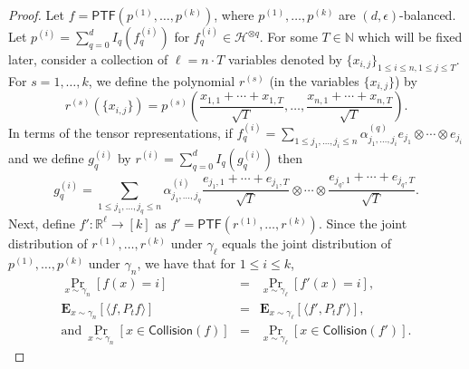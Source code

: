 \documentclass[11pt]{article}
\numberwithin{equation}{section}
\theoremstyle{definition}
\theoremstyle{plain}
\begin{document}
\begin{proof}
    Let $f = \mathsf{PTF}(p^{(1)}, \ldots, p^{(k)})$, where $p^{(1)}, \dots, p^{(k)}$ are $(d, \epsilon)$-balanced.
    Let $p^{(i)} = \sum_{q=0}^d I_q (f_q^{(i)})$ for $f_q^{(i)} \in \mathcal{H}^{\otimes q}$.
    For some $T \in \mathbb{N}$ which will be fixed later, consider a
    collection of $\ell = n \cdot T$ variables denoted by  $\{x_{i,j}\}_{1 \le
    i \le n, 1 \le j \le T}$.
    For $s = 1, \dots, k$, we define the polynomial $r^{(s)}$ (in the variables $\{x_{i,j}\}$) by
    \[
        r^{(s)}(\{x_{i,j}\}) = p^{(s)} \left(
            \frac{x_{1,1} + \cdots + x_{1,T}}{\sqrt T}, \dots, \frac{x_{n,1} + \cdots + x_{n,T}}{\sqrt T}
        \right).
    \]
    In terms of the tensor representations, if
    $f_q^{(i)} = \sum_{1 \le j_1, \ldots, j_i \le n} \alpha^{(q)}_{j_1, \ldots, j_i} e_{j_1} \otimes \cdots \otimes e_{j_i}$
    and we define $g^{(i)}_q$ by $r^{(i)} = \sum_{q=0}^d I_q(g^{(i)}_q)$ then
$$
g_{q}^{(i)}= \sum_{1 \le j_1, \ldots, j_q \le n} \alpha^{(i)}_{j_1, \ldots, j_q} \frac{e_{j_1,1} + \cdots + e_{j_1,T}}{\sqrt{T}} \otimes \cdots \otimes \frac{e_{j_q,1} + \cdots + e_{j_q,T}}{\sqrt{T}}. 
$$
Next, define $f' : \mathbb{R}^{\ell} \rightarrow [k]$ as $f'= \mathsf{PTF}(r^{(1)}, \ldots, r^{(k)})$. Since the joint distribution
of $r^{(1)}, \dots, r^{(k)}$ under $\gamma_\ell$ equals the joint distribution of $p^{(1)}, \dots, p^{(k)}$ under $\gamma_n$,
we have that for $1\le i \le k$,
\begin{eqnarray}
\Pr_{x \sim \gamma_n}[f(x)=i] &=&\Pr_{x \sim \gamma_\ell}[f'(x)=i], \nonumber \\ 
\mathbf{E}_{x \sim \gamma_n} [\langle f, P_t f \rangle]&=&\mathbf{E}_{x \sim \gamma_\ell} [\langle f', P_t f' \rangle], \nonumber \\
\textrm{and} \ \Pr_{x \sim \gamma_n} [x \in \mathsf{Collision}(f)] &=& \Pr_{x \sim \gamma_\ell} [x \in \mathsf{Collision}(f')]. \label{eq:equality} 
\end{eqnarray}


\end{proof}
\end{document}
